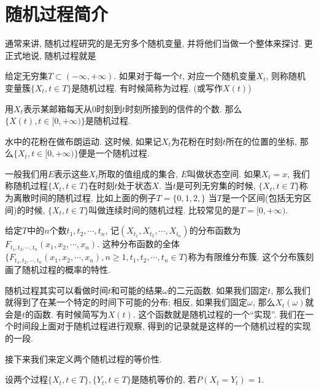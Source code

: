 \section{随机过程简介}

通常来讲, 随机过程研究的是无穷多个随机变量, 并将他们当做一个整体来探讨. 更正式地说, 随机过程就是
\begin{definition}
    给定无穷集$T\subset (-\infty, +\infty)$. 如果对于每一个$t$, 对应一个随机变量$X_t$, 则称随机变量簇$\{X_t,t\in T\}$是随机过程. 有时候简称为过程. (或写作$X(t)$)
\end{definition}

\begin{example}
    用$X_t$表示某邮箱每天从0时刻到$t$时刻所接到的信件的个数. 那么$\{X(t), t\in [0, +\infty)\}$是随机过程.
\end{example}

\begin{example}
    水中的花粉在做布朗运动. 这时候, 如果记$X_t$为花粉在时刻$t$所在的位置的坐标, 那么$\{X_t,t\in [0, +\infty)\}$便是一个随机过程. 
\end{example}

一般我们用$E$表示这些$X_t$所取的值组成的集合, $E$叫做状态空间. 如果$X_t = x$, 我们称随机过程$\{X_t, t\in T\}$在时刻$t$处于状态$X$. 当$t$是可列无穷集的时候, $\{X_t, t\in T\}$称为离散时间的随机过程. 比如上面的例子$T=\{0,1,2,\}$ 当$T$是一个区间(包括无穷区间)的时候, $\{X_t, t\in T\}$叫做连续时间的随机过程. 比较常见的是$T=[0,+\infty)$.

给定$T$中的$n$个数$t_1, t_2, \cdots, t_n$, 记$(X_{t_1}, X_{t_2}, \cdots, X_{t_n})$的分布函数为$F_{t_1, t_2, \cdots, t_n}(x_1, x_2, \cdots, x_n)$. 这种分布函数的全体$\{F_{t_1, t_2, \cdots, t_n}(x_1, x_2, \cdots, x_n), n\geq 1, t_1,t_2,\cdots, t_n\in T\}$称为有限维分布簇. 这个分布簇刻画了随机过程的概率的特性. 

随机过程其实可以看做时间$t$和可能的结果$\omega$的二元函数. 如果我们固定$t$, 那么我们就得到了在某一个特定的时间下可能的分布; 相反, 如果我们固定$\omega$, 那么$X_t(\omega)$就会是$t$的函数. 有时候简写为$X(t)$. 这个函数就是随机过程的一个``实现''. 我们在一个时间段上面对于随机过程进行观察, 得到的记录就是这样的一个随机过程的实现的一段. 

接下来我们来定义两个随机过程的等价性. 

\begin{definition}
    设两个过程$\{X_t, t\in T\}, \{Y_t, t\in T\}$是随机等价的, 若$P(X_t = Y_t)=1$. 
\end{definition}